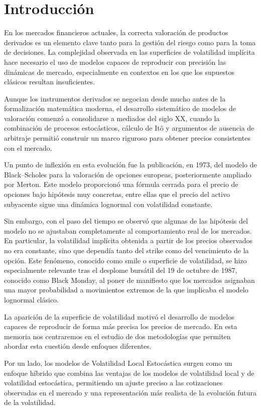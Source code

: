 
\chapter{Introducción}

En los mercados financieros actuales, la correcta valoración de productos derivados es un elemento clave tanto para la gestión del riesgo como para la toma de decisiones. La complejidad observada en las superficies de volatilidad implícita hace necesario el uso de modelos capaces de reproducir con precisión las dinámicas de mercado, especialmente en contextos en los que los supuestos clásicos resultan insuficientes. \medskip

Aunque los instrumentos derivados se negocian desde mucho antes de la formalización matemática moderna, el desarrollo sistemático de modelos de valoración comenzó a consolidarse a mediados del siglo XX, cuando la combinación de procesos estocásticos, cálculo de Itô y argumentos de ausencia de arbitraje permitió construir un marco riguroso para obtener precios consistentes con el mercado. \medskip

Un punto de inflexión en esta evolución fue la publicación, en 1973, del modelo de Black--Scholes para la valoración de opciones europeas, posteriormente ampliado por Merton. Este modelo proporcionó una fórmula cerrada para el precio de opciones bajo hipótesis muy concretas, entre ellas que el precio del activo subyacente sigue una dinámica lognormal con volatilidad constante.  \medskip

Sin embargo, con el paso del tiempo se observó que algunas de las hipótesis del modelo no se ajustaban completamente al comportamiento real de los mercados. En particular, la volatilidad implícita obtenida a partir de los precios observados no era constante, sino que dependía tanto del strike como del vencimiento de la opción. Este fenómeno, conocido como smile o superficie de volatilidad, se hizo especialmente relevante tras el desplome bursátil del 19 de octubre de 1987, conocido como Black Monday, al poner de manifiesto que los mercados asignaban una mayor probabilidad a movimientos extremos de la que implicaba el modelo lognormal clásico. \medskip

La aparición de la superficie de volatilidad motivó el desarrollo de modelos capaces de reproducir de forma más precisa los precios de mercado. En esta memoria nos centraremos en el estudio de dos metodologías que permiten abordar esta cuestión desde enfoques diferentes.

Por un lado, los modelos de Volatilidad Local Estocástica surgen como un enfoque híbrido que combina las ventajas de los modelos de volatilidad local y de volatilidad estocástica, permitiendo un ajuste preciso a las cotizaciones observadas en el mercado y una representación más realista de la evolución futura de la volatilidad.

